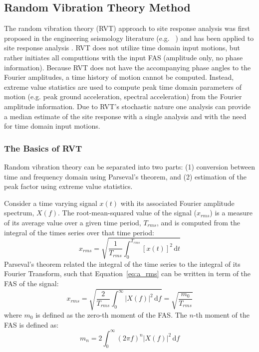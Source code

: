 \documentclass[11pt]{report}
\newcommand{\ud}{\,\mathrm{d}}
\begin{document}
\subsection{Random Vibration Theory Method}\label{ch:siteResponse:methods:rvt}
The random vibration theory (RVT) approach to site response analysis was first proposed in the
engineering seismology literature (e.g. ~\citet{schneider:91}) and has been applied to site response
analysis \citep{silva:97,rathje:05}. RVT does not utilize time domain input motions, but rather
initiates all computtions with the input FAS (amplitude only, no phase information).  Because RVT
does not have the accompanying phase angles to the Fourier amplitudes, a time history of motion
cannot be computed.  Instead, extreme value statistics are used to compute peak time domain
parameters of motion (e.g. peak ground acceleration, spectral acceleration) from the Fourier
amplitude information. Due to RVT's stochastic nature one analysis can provide a median estimate of
the site response with a single analysis and with the need for time domain input motions.  

\subsubsection{The Basics of RVT}
Random vibration theory can be separated into two parts: (1) conversion between time and frequency
domain using Parseval's theorem, and (2) estimation of the peak factor using extreme value
statistics.

Consider a time varying signal $x(t)$ with its associated Fourier amplitude spectrum, $X(f)$.  The
root-mean-squared value of the signal ($x_{rms}$) is a measure of its average value over a given
time period, $T_{rms}$, and is computed from the integral of the times series over that time period:
\begin{equation}
  x_{rms} = \sqrt{ \frac{1}{T_{rms}} \int_0^{T_{rms}} \left[ x(t) \right]^2 \ud t }
  \label{eq:a_rms}
\end{equation}
Parseval's theorem related the integral of the time series to the integral of its Fourier Transform,
such that Equation~\ref{eq:a_rms} can be written in term of the FAS of the signal:
\begin{equation}
  x_{rms} = \sqrt{ \frac{2}{T_{rms}} \int_0^{\infty} |X(f)|^2 \ud f } = \sqrt{\frac{m_0}{T_{rms}}}
  \label{eq:rvt:rms}
\end{equation}
where $m_0$ is defined as the zero-th moment of the FAS.  The $n$-th moment of the FAS is defined
as:
\begin{equation}
  m_n = 2 \int_0^{\infty} \left( 2 \pi f \right)^n |X(f)|^2 \ud f
  \label{eq:rvt:moments}
\end{equation}
\end{document}
